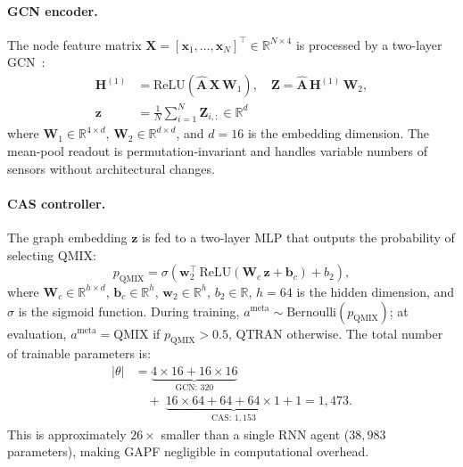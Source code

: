 \documentclass[journal]{IEEEtran}
\begin{document}
\paragraph{GCN encoder.}
The node feature matrix $\mathbf{X} = [\mathbf{x}_1, \dots, \mathbf{x}_N]^\top \in \mathbb{R}^{N \times 4}$ is processed by a two-layer GCN~\cite{kipf2017semi}:
\begin{align}
    \mathbf{H}^{(1)} &= \text{ReLU}(\hat{\mathbf{A}}\,\mathbf{X}\,\mathbf{W}_1), \quad
    \mathbf{Z} = \hat{\mathbf{A}}\,\mathbf{H}^{(1)}\,\mathbf{W}_2, \nonumber\\
    \mathbf{z} &= \tfrac{1}{N}\textstyle\sum_{i=1}^{N} \mathbf{Z}_{i,:} \in \mathbb{R}^{d}
    \label{eq:gcn}
\end{align}
where $\mathbf{W}_1 \in \mathbb{R}^{4 \times d}$, $\mathbf{W}_2 \in \mathbb{R}^{d \times d}$, and $d = 16$ is the embedding dimension. The mean-pool readout is permutation-invariant and handles variable numbers of sensors without architectural changes.

\paragraph{CAS controller.}
The graph embedding $\mathbf{z}$ is fed to a two-layer MLP that outputs the probability of selecting QMIX:
\begin{equation}
    p_{\text{QMIX}} = \sigma\!\left(\mathbf{w}_2^\top\,\text{ReLU}\!\left(\mathbf{W}_c\,\mathbf{z} + \mathbf{b}_c\right) + b_2\right),
    \label{eq:cas_controller}
\end{equation}
where $\mathbf{W}_c \in \mathbb{R}^{h \times d}$, $\mathbf{b}_c \in \mathbb{R}^h$, $\mathbf{w}_2 \in \mathbb{R}^h$, $b_2 \in \mathbb{R}$, $h = 64$ is the hidden dimension, and $\sigma$ is the sigmoid function. During training, $a^{\text{meta}} \sim \text{Bernoulli}(p_{\text{QMIX}})$; at evaluation, $a^{\text{meta}} = \text{QMIX}$ if $p_{\text{QMIX}} > 0.5$, QTRAN otherwise. The total number of trainable parameters is:
\begin{align}
    |\theta| &= \underbrace{4 \times 16 + 16 \times 16}_{\text{GCN: } 320} \nonumber\\
             &\quad+\; \underbrace{16 \times 64 + 64 + 64 \times 1 + 1}_{\text{CAS: } 1{,}153} = 1{,}473.
    \label{eq:param_count}
\end{align}
This is approximately $26\times$ smaller than a single RNN agent ($38{,}983$ parameters), making GAPF negligible in computational overhead.
\end{document}
